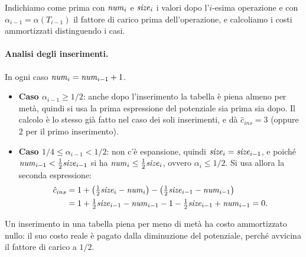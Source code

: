 Indichiamo come prima con $\mathit{num}_i$ e $\mathit{size}_i$ i valori dopo l'$i$-esima operazione e con $\alpha_{i-1} = \alpha(T_{i-1})$ il fattore di carico prima dell'operazione, e calcoliamo i costi ammortizzati distinguendo i casi.

\paragraph{Analisi degli inserimenti.}
In ogni caso $\mathit{num}_i = \mathit{num}_{i-1} + 1$.
\begin{itemize}
    \item \textbf{Caso $\alpha_{i-1} \ge 1/2$}: anche dopo l'inserimento la tabella è piena almeno per metà, quindi si usa la prima espressione del potenziale sia prima sia dopo. Il calcolo è lo stesso già fatto nel caso dei soli inserimenti, e dà $\hat{c}_{ins} = 3$ (oppure $2$ per il primo inserimento).
    \item \textbf{Caso $1/4 \le \alpha_{i-1} < 1/2$}: non c'è espansione, quindi $\mathit{size}_i = \mathit{size}_{i-1}$, e poiché $\mathit{num}_{i-1} < \frac{1}{2}\mathit{size}_{i-1}$ si ha $\mathit{num}_i \le \frac{1}{2}\mathit{size}_i$, ovvero $\alpha_i \le 1/2$. Si usa allora la seconda espressione:
    \[
    \begin{aligned}
    \hat{c}_{ins} &= 1 + \left(\tfrac{1}{2}\mathit{size}_i - \mathit{num}_i\right) - \left(\tfrac{1}{2}\mathit{size}_{i-1} - \mathit{num}_{i-1}\right) \\
    &= 1 + \tfrac{1}{2}\mathit{size}_{i-1} - \mathit{num}_{i-1} - 1 - \tfrac{1}{2}\mathit{size}_{i-1} + \mathit{num}_{i-1} = 0.
    \end{aligned}
    \]
\end{itemize}
Un inserimento in una tabella piena per meno di metà ha costo ammortizzato nullo: il suo costo reale è pagato dalla diminuzione del potenziale, perché avvicina il fattore di carico a $1/2$.

